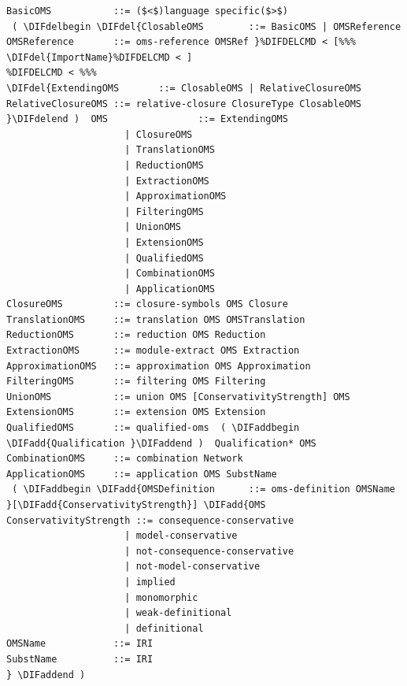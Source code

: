 \documentclass[10pt,fleqn,final]{scrreprt}
\newenvironment{definitions}[0]{\medskip }{}
\providecommand{\DIFadd}[1]{{\protect\color{blue}\uwave{#1}}} %
\providecommand{\DIFdel}[1]{{\protect\color{red}\sout{#1}}}                      %
\providecommand{\DIFaddbegin}{} %
\providecommand{\DIFaddend}{} %
\providecommand{\DIFdelbegin}{} %
\providecommand{\DIFdelend}{} %
\begin{document}
\begin{definitions}
\begin{lstlisting}[language=ebnf,escapeinside={()}]
BasicOMS           ::= ($<$)language specific($>$) 
 ( \DIFdelbegin \DIFdel{ClosableOMS        ::= BasicOMS | OMSReference
OMSReference       ::= oms-reference OMSRef }%DIFDELCMD < [%%%
\DIFdel{ImportName}%DIFDELCMD < ]
%DIFDELCMD < %%%
\DIFdel{ExtendingOMS       ::= ClosableOMS | RelativeClosureOMS
RelativeClosureOMS ::= relative-closure ClosureType ClosableOMS
}\DIFdelend )  OMS                ::= ExtendingOMS
                     | ClosureOMS
                     | TranslationOMS
                     | ReductionOMS
                     | ExtractionOMS
                     | ApproximationOMS
                     | FilteringOMS
                     | UnionOMS
                     | ExtensionOMS
                     | QualifiedOMS
                     | CombinationOMS
                     | ApplicationOMS
ClosureOMS         ::= closure-symbols OMS Closure
TranslationOMS     ::= translation OMS OMSTranslation
ReductionOMS       ::= reduction OMS Reduction
ExtractionOMS      ::= module-extract OMS Extraction
ApproximationOMS   ::= approximation OMS Approximation
FilteringOMS       ::= filtering OMS Filtering
UnionOMS           ::= union OMS [ConservativityStrength] OMS
ExtensionOMS       ::= extension OMS Extension
QualifiedOMS       ::= qualified-oms  ( \DIFaddbegin \DIFadd{Qualification }\DIFaddend )  Qualification* OMS
CombinationOMS     ::= combination Network
ApplicationOMS     ::= application OMS SubstName
 ( \DIFaddbegin \DIFadd{OMSDefinition      ::= oms-definition OMSName }[\DIFadd{ConservativityStrength}] \DIFadd{OMS
ConservativityStrength ::= consequence-conservative
                     | model-conservative
                     | not-consequence-conservative
                     | not-model-conservative
                     | implied
                     | monomorphic
                     | weak-definitional
                     | definitional
OMSName            ::= IRI
SubstName          ::= IRI
} \DIFaddend )
\end{lstlisting}


\end{definitions}
\end{document}
